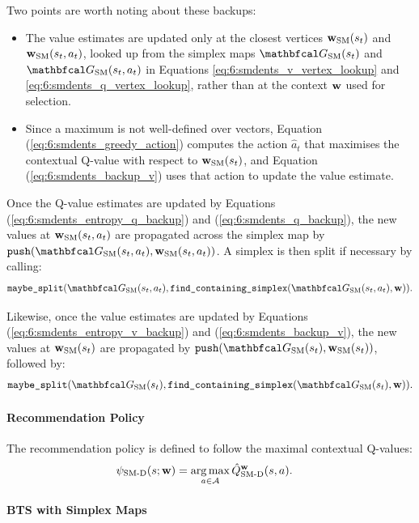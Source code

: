     Two points are worth noting about these backups:
    \begin{itemize}
        \item The value estimates are updated only at the closest vertices ${\mathbf{w}_{{\textnormal{SM}}}(s_t)}$ and ${\mathbf{w}_{{\textnormal{SM}}}(s_t,a_t)}$, looked up from the simplex maps $\GSM(s_t)$ and $\GSM(s_t,a_t)$ in Equations \eqref{eq:6:smdents_v_vertex_lookup} and \eqref{eq:6:smdents_q_vertex_lookup}, rather than at the context $\mathbf{w}$ used for selection.
        \item Since a maximum is not well-defined over vectors, Equation (\ref{eq:6:smdents_greedy_action}) computes the action $\hat{a}_t$ that maximises the contextual Q-value with respect to ${\mathbf{w}_{{\textnormal{SM}}}(s_t)}$, and Equation (\ref{eq:6:smdents_backup_v}) uses that action to update the value estimate.
    \end{itemize}

    Once the Q-value estimates are updated by Equations (\ref{eq:6:smdents_entropy_q_backup}) and (\ref{eq:6:smdents_q_backup}), the new values at ${\mathbf{w}_{{\textnormal{SM}}}(s_t,a_t)}$ are propagated across the simplex map by $\push(\GSM(s_t,a_t),\wSMat{s_t,a_t})$. A simplex is then split if necessary by calling:
    \begin{align}
        \splitsimplex(\GSM(s_t,a_t),\fcs(\GSM(s_t,a_t),\bff{w})).
    \end{align}

    Likewise, once the value estimates are updated by Equations (\ref{eq:6:smdents_entropy_v_backup}) and (\ref{eq:6:smdents_backup_v}), the new values at ${\mathbf{w}_{{\textnormal{SM}}}(s_t)}$ are propagated by $\push(\GSM(s_t),\wSMat{s_t})$, followed by:
    \begin{align}
        \splitsimplex(\GSM(s_t),\fcs(\GSM(s_t),\bff{w})).
    \end{align}
    



    \paragraph{Recommendation Policy}

    The recommendation policy is defined to follow the maximal contextual Q-values:
    \begin{align}
        {\psi_{{\textnormal{SM-D}}}}(s;\mathbf{w}) &= \operatorname*{arg\,max}_{a\in\mathcal{A}} {\hat{Q}^{\mathbf{w}}_{{\textnormal{SM-D}}}}(s,a).
    \end{align}




    \paragraph{BTS with Simplex Maps}

